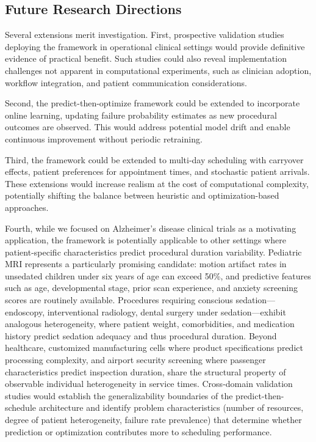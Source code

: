 \documentclass[11pt,a4paper]{article}
\begin{document}
\subsection{Future Research Directions}

Several extensions merit investigation. First, prospective validation studies deploying the framework in operational clinical settings would provide definitive evidence of practical benefit. Such studies could also reveal implementation challenges not apparent in computational experiments, such as clinician adoption, workflow integration, and patient communication considerations.

Second, the predict-then-optimize framework could be extended to incorporate online learning, updating failure probability estimates as new procedural outcomes are observed. This would address potential model drift and enable continuous improvement without periodic retraining.

Third, the framework could be extended to multi-day scheduling with carryover effects, patient preferences for appointment times, and stochastic patient arrivals. These extensions would increase realism at the cost of computational complexity, potentially shifting the balance between heuristic and optimization-based approaches.

Fourth, while we focused on Alzheimer's disease clinical trials as a motivating application, the framework is potentially applicable to other settings where patient-specific characteristics predict procedural duration variability. Pediatric MRI represents a particularly promising candidate: motion artifact rates in unsedated children under six years of age can exceed 50\%, and predictive features such as age, developmental stage, prior scan experience, and anxiety screening scores are routinely available. Procedures requiring conscious sedation---endoscopy, interventional radiology, dental surgery under sedation---exhibit analogous heterogeneity, where patient weight, comorbidities, and medication history predict sedation adequacy and thus procedural duration. Beyond healthcare, customized manufacturing cells where product specifications predict processing complexity, and airport security screening where passenger characteristics predict inspection duration, share the structural property of observable individual heterogeneity in service times. Cross-domain validation studies would establish the generalizability boundaries of the predict-then-schedule architecture and identify problem characteristics (number of resources, degree of patient heterogeneity, failure rate prevalence) that determine whether prediction or optimization contributes more to scheduling performance.
\end{document}
